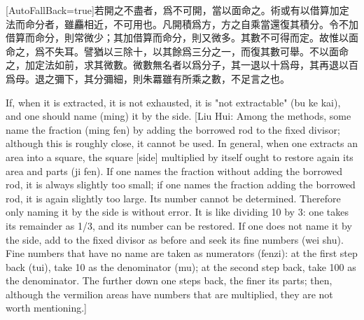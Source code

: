 \documentclass[11pt]{article}
\newcommand{\zhsmall}{\footnotesize\color{black!70}}
\newcommand{\unitlabel}[1]{\marginpar{\raggedleft\tiny\color{gray}#1}}
\newenvironment{unitzh}{\par\CJKfontspec{Noto Serif CJK SC}[AutoFallBack=true]\large\linespread{1.25}\selectfont}{\par}
\newenvironment{uniten}{\par\small\color{black!85}}{\par\medskip}
\begin{document}
\begin{unitzh}\unitlabel{jiuzhang-015.13}若開之不盡者，爲不可開，當以面命之。{\zhsmall 術或有以借算加定法而命分者，雖麤相近，不可用也。凡開積爲方，方之自乘當還復其積分。令不加借算而命分，則常微少；其加借算而命分，則又微多。其數不可得而定。故惟以面命之，爲不失耳。譬猶以三除十，以其餘爲三分之一，而復其數可舉。不以面命之，加定法如前，求其微數。微數無名者以爲分子，其一退以十爲母，其再退以百爲母。退之彌下，其分彌細，則朱羃雖有所乘之數，不足言之也。}\end{unitzh}
\begin{uniten}If, when it is extracted, it is not exhausted, it is "not extractable" (bu ke kai), and one should name (ming) it by the side. [Liu Hui: Among the methods, some name the fraction (ming fen) by adding the borrowed rod to the fixed divisor; although this is roughly close, it cannot be used. In general, when one extracts an area into a square, the square [side] multiplied by itself ought to restore again its area and parts (ji fen). If one names the fraction without adding the borrowed rod, it is always slightly too small; if one names the fraction adding the borrowed rod, it is again slightly too large. Its number cannot be determined. Therefore only naming it by the side is without error. It is like dividing 10 by 3: one takes its remainder as 1/3, and its number can be restored. If one does not name it by the side, add to the fixed divisor as before and seek its fine numbers (wei shu). Fine numbers that have no name are taken as numerators (fenzi): at the first step back (tui), take 10 as the denominator (mu); at the second step back, take 100 as the denominator. The further down one steps back, the finer its parts; then, although the vermilion areas have numbers that are multiplied, they are not worth mentioning.]\end{uniten}
\end{document}
